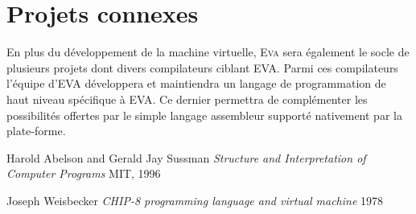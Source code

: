 \documentclass[11pt,twoside,french]{article}
\newcommand{\noun}[1]{\textsc{#1}}
\begin{document}
\section{Projets connexes}

En plus du développement de la machine virtuelle, \noun{Eva} sera
également le socle de plusieurs projets dont divers compilateurs ciblant
EVA. Parmi ces compilateurs l'équipe d'EVA développera et maintiendra
un langage de programmation de haut niveau spécifique à EVA. Ce dernier
permettra de complémenter les possibilités offertes par le simple langage
assembleur supporté nativement par la plate-forme.

\newpage{}

\clearpage{}

\begin{thebibliography}{XXXXXX}
\label{chap:bib}

 Harold Abelson and Gerald Jay Sussman
\emph{Structure and Interpretation of Computer Programs} MIT, 1996

 Joseph Weisbecker
\emph{CHIP-8 programming language and virtual machine} 1978

\end{thebibliography}
\end{document}
